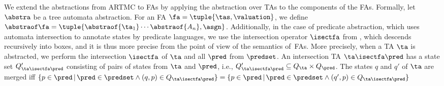 

We extend the abstractions from ARTMC to FAs by applying the abstraction over TAs to the components of the FAs.
Formally, let $\abstra$ be a tree automata abstraction.
For an FA $\fa =\tuple{\tas, \valuation}$,
we define $\abstraof \fa = \tuple{\abstraof{\ta_1}\cdots\abstraof{A_n},\asgn}$. 
%
Additionally, in the case of predicate abstraction,
which uses automata intersection to annotate states by predicate languages,
we use the intersection operator $\isectfa$ from ,
which descends recursively into boxes, and it is thus more precise from the point
of view of the semantics of~FAs.
More precisely, when a TA $\ta$ is abstracted, we perform the intersection $\isectfa$ of $\ta$ and
all $\pred$ from $\predset$. An intersection TA $\ta \isectfa \pred$ has a state set
$Q'_{\ta \isectfa \pred}$ consisting of pairs of states from $\ta$ and
$\pred$, i.e., $Q'_{\ta \isectfa \pred} \subseteq Q_\ta \times Q_\pred$.
The states $q$ and $q'$ of $\ta$ are merged iff $\{p \in \pred \,|\, \pred \in \predset \wedge (q,p) \in Q_{\ta \isectfa \pred}\}
= \{p \in \pred \,|\, \pred \in \predset \wedge (q',p) \in Q_{\ta \isectfa \pred}\}$

